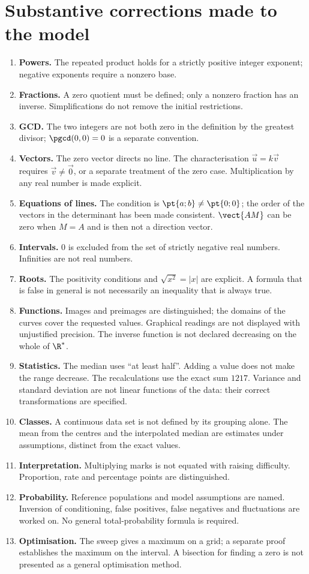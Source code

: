 \section*{Substantive corrections made to the model}
\begin{enumerate}
\item \textbf{Powers.} The repeated product holds for a strictly positive integer exponent; negative exponents require a nonzero base.
\item \textbf{Fractions.} A zero quotient must be defined; only a nonzero fraction has an inverse. Simplifications do not remove the initial restrictions.
\item \textbf{GCD.} The two integers are not both zero in the definition by the greatest divisor; $\pgcd(0,0)=0$ is a separate convention.
\item \textbf{Vectors.} The zero vector directs no line. The characterisation $\vec u=k\vec v$ requires $\vec v\ne\vec0$, or a separate treatment of the zero case. Multiplication by any real number is made explicit.
\item \textbf{Equations of lines.} The condition is $\pt{a;b}\ne\pt{0;0}$; the order of the vectors in the determinant has been made consistent. $\vect{AM}$ can be zero when $M=A$ and is then not a direction vector.
\item \textbf{Intervals.} $0$ is excluded from the set of strictly negative real numbers. Infinities are not real numbers.
\item \textbf{Roots.} The positivity conditions and $\sqrt{x^2}=|x|$ are explicit. A formula that is false in general is not necessarily an inequality that is always true.
\item \textbf{Functions.} Images and preimages are distinguished; the domains of the curves cover the requested values. Graphical readings are not displayed with unjustified precision. The inverse function is not declared decreasing on the whole of $\R^*$.
\item \textbf{Statistics.} The median uses ``at least half''. Adding a value does not make the range decrease. The recalculations use the exact sum $1217$. Variance and standard deviation are not linear functions of the data: their correct transformations are specified.
\item \textbf{Classes.} A continuous data set is not defined by its grouping alone. The mean from the centres and the interpolated median are estimates under assumptions, distinct from the exact values.
\item \textbf{Interpretation.} Multiplying marks is not equated with raising difficulty. Proportion, rate and percentage points are distinguished.
\item \textbf{Probability.} Reference populations and model assumptions are named. Inversion of conditioning, false positives, false negatives and fluctuations are worked on. No general total-probability formula is required.
\item \textbf{Optimisation.} The sweep gives a maximum on a grid; a separate proof establishes the maximum on the interval. A bisection for finding a zero is not presented as a general optimisation method.
\end{enumerate}

